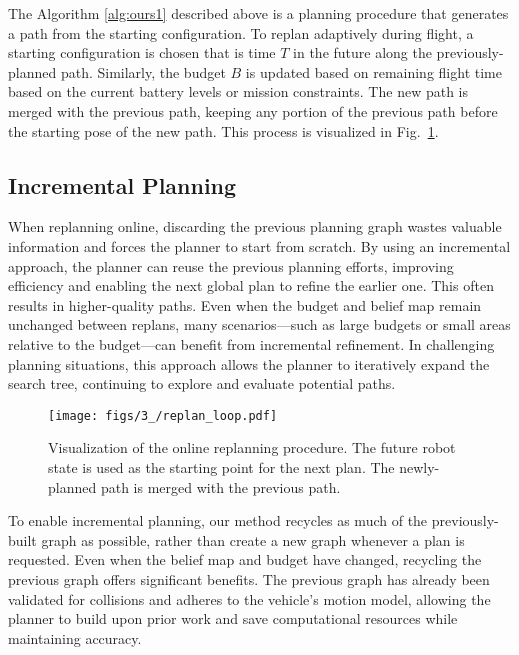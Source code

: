The Algorithm \ref{alg:ours1} described above is a planning procedure that generates a path from the starting configuration. To replan adaptively during flight, a starting configuration is chosen that is time $T$ in the future along the previously-planned path. Similarly, the budget $B$ is updated based on remaining flight time based on the current battery levels or mission constraints. The new path is merged with the previous path, keeping any portion of the previous path before the starting pose of the new path. This process is visualized in Fig.~\ref{fig:planner_replan}.

\subsection{Incremental Planning}\label{sec:incr-adap-plan}



When replanning online, discarding the previous planning graph wastes valuable information and forces the planner to start from scratch. By using an incremental approach, the planner can reuse the previous planning efforts, improving efficiency and enabling the next global plan to refine the earlier one. This often results in higher-quality paths.
Even when the budget and belief map remain unchanged between replans, many scenarios---such as large budgets or small areas relative to the budget---can benefit from incremental refinement. In challenging planning situations, this approach allows the planner to iteratively expand the search tree, continuing to explore and evaluate potential paths.

\begin{figure}[t]
\centering
\texttt{[image: figs/3\_/replan\_loop.pdf]}
\caption{Visualization of the online replanning procedure. The future robot state is used as the starting point for the next plan. The newly-planned path is merged with the previous path.}
\label{fig:planner_replan}
\end{figure}

To enable incremental planning, our method recycles as much of the previously-built graph as possible, rather than create a new graph whenever a plan is requested. Even when the belief map and budget have changed, recycling the previous graph offers significant benefits. The previous graph has already been validated for collisions and adheres to the vehicle's motion model, allowing the planner to build upon prior work and save computational resources while maintaining accuracy.

